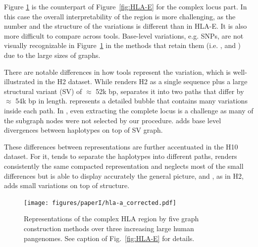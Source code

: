 Figure \ref{fig:HLA-A} is the counterpart of Figure~\ref{fig:HLA-E} for the complex locus part. In this case the overall interpretability of the region is more challenging, as the number and the structure of the variations is different than in HLA-E. It is also more difficult to compare across tools. Base-level variations, e.g. SNPs, are not visually recognizable in Figure~\ref{fig:HLA-A} in the methods that retain them (i.e. \pggb, \mcactus and \bifrost) due to the large sizes of graphs.

There are notable differences in how  tools represent the variation, which is well-illustrated in the H2 dataset. While \minigraph renders H2 as a single sequence plus a large structural variant (SV) of $\approx$ 52k bp, \pggb separates it into two paths that differ by $\approx$ 54k bp in length. \bifrost represents a detailed bubble that contains many variations inside each path. In \mdbg, even extracting the complete locus is a challenge as many of the subgraph nodes were not selected by our procedure. \mcactus adds base level divergences between haplotypes on top of \minigraph SV graph.

These differences between representations are further accentuated in the H10 dataset. For it, \pggb tends to separate the haplotypes into different paths, \bifrost renders consistently the same compacted representation and \minigraph neglects most of the small differences but is able to display accurately the general picture, and \mcactus, as in H2, adds small variations on top of \minigraph structure. 


\begin{figure}[htp]
	\centering
	\texttt{[image: figures/paperI/hla-a\_corrected.pdf]}
	\caption[Representations of the HLA-A locus on large human pangenomes.]{Representations of the complex HLA region by five graph construction methods over three increasing large human pangenomes. 
		See caption of Fig.~\ref{fig:HLA-E} for details. 
	}
	\label{fig:HLA-A}
\end{figure}

